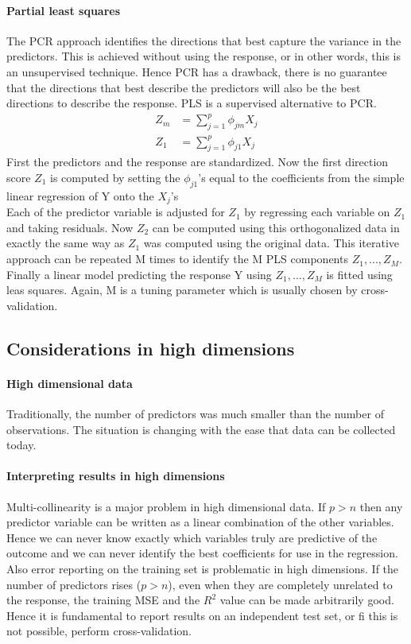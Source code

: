 \documentclass[../document.tex]{subfiles}
\begin{document}
	\paragraph{Partial least squares}
	The PCR approach identifies the directions that best capture the variance in the predictors. This is achieved without using the response, or in other words, this is an unsupervised technique. Hence PCR has a drawback, there is no guarantee that the directions that best describe the predictors will also be the best directions to describe the response. PLS is a supervised alternative to PCR.
	\begin{equation}
	\begin{split}
		Z_{m}&=\sum_{j=1}^{p}\phi_{jm}X_{j}\\
		Z_{1}&=\sum_{j=1}^{p}\phi_{j1}X_{j}
	\end{split}
	\end{equation}
	First the predictors and the response are standardized. Now the first direction score \(Z_{1}\) is computed by setting the \(\phi_{j1}\)'s equal to the coefficients from the simple linear regression of Y onto the \(X_{j}\)'s\\
	Each of the predictor variable is adjusted for \(Z_{1}\) by regressing each variable on \(Z_{1}\) and taking residuals. Now \(Z_{2}\) can be computed using this orthogonalized data in exactly the same way as \(Z_{1}\) was computed using the original data. This iterative approach can be repeated M times to identify the M PLS components \(Z_{1},...,Z_{M}\). Finally a linear model predicting the response Y using \(Z_{1},...,Z_{M}\) is fitted using leas squares. Again, M is a tuning parameter which is usually chosen by cross-validation.

	\subsection{Considerations in high dimensions}

	\paragraph{High dimensional data}
	Traditionally, the number of predictors was much smaller than the number of observations. The situation is changing with the ease that data can be collected today.

	\paragraph{Interpreting results in high dimensions}
	Multi-collinearity is a major problem in high dimensional data. If \(p>n\) then any predictor variable can be written as a linear combination of the other variables. Hence we can never know exactly which variables truly are predictive of the outcome and we can never identify the best coefficients for use in the regression. Also error reporting on the training set is problematic in high dimensions. If the number of predictors rises (\(p>n\)), even when they are completely unrelated to the response, the training MSE and the \(R^2\) value can be made arbitrarily good. Hence it is fundamental to report results on an independent test set, or fi this is not possible, perform cross-validation.
\end{document}
